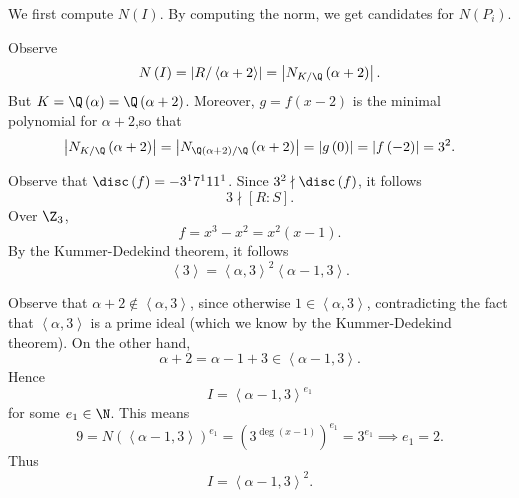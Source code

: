 \documentclass[pmath441]{subfiles}
\begin{document}
    \begin{answer}
        We first compute $N\left( I \right)$. By computing the norm, we get candidates for $N\left( P_i \right)$.

        Observe
        \begin{equation*}
            N\left( I \right) = \left| R /\left< \alpha+2 \right>  \right| = \left| N_{K /\Q}\left( \alpha+2 \right) \right|.
        \end{equation*}
        But $K = \Q\left( \alpha \right) = \Q\left( \alpha+2 \right)$. Moreover, $g=f\left( x-2 \right)$ is the minimal polynomial for $\alpha+2$,\footnotemark[1] so that
        \begin{equation*}
            \left| N_{K /\Q}\left( \alpha+2 \right) \right| = \left| N_{\Q\left( \alpha+2 \right) /\Q}\left( \alpha+2 \right) \right| = \left| g\left( 0 \right) \right| = \left| f\left( -2 \right) \right| = 3^{2}.
        \end{equation*}

        Observe that $\disc\left( f \right) = -3^17^111^1$. Since $3^{2}\nmid\disc\left( f \right)$, it follows
        \begin{equation*}
            3\nmid\left[ R:S \right].
        \end{equation*}
        Over $\Z_3$,
        \begin{equation*}
            f = x^{3}-x^{2} = x^{2}\left( x-1 \right).
        \end{equation*}
        By the Kummer-Dedekind theorem, it follows
        \begin{equation*}
            \left< 3 \right> = \left< \alpha,3 \right>^{2}\left< \alpha-1,3 \right>.   
        \end{equation*}

        Observe that $\alpha+2\notin\left< \alpha,3 \right>$, since otherwise $1\in\left< \alpha,3 \right>$, contradicting the fact that $\left< \alpha,3 \right>$ is a prime ideal (which we know by the Kummer-Dedekind theorem). On the other hand,
        \begin{equation*}
            \alpha+2 = \alpha-1+3 \in \left< \alpha-1,3 \right>. 
        \end{equation*}
        Hence
        \begin{equation*}
            I = \left< \alpha-1,3 \right>^{e_1} 
        \end{equation*}
        for some $e_1\in\N$. This means
        \begin{equation*}
            9 = N\left( \left< \alpha-1,3 \right>  \right)^{e_1} = \left( 3^{\deg\left( x-1 \right)} \right)^{e_1} = 3^{e_1} \implies e_1 = 2.
        \end{equation*}
        Thus
        \begin{equation*}
            I = \left< \alpha-1,3 \right>^{2}. 
        \end{equation*}


\end{answer}
\end{document}

